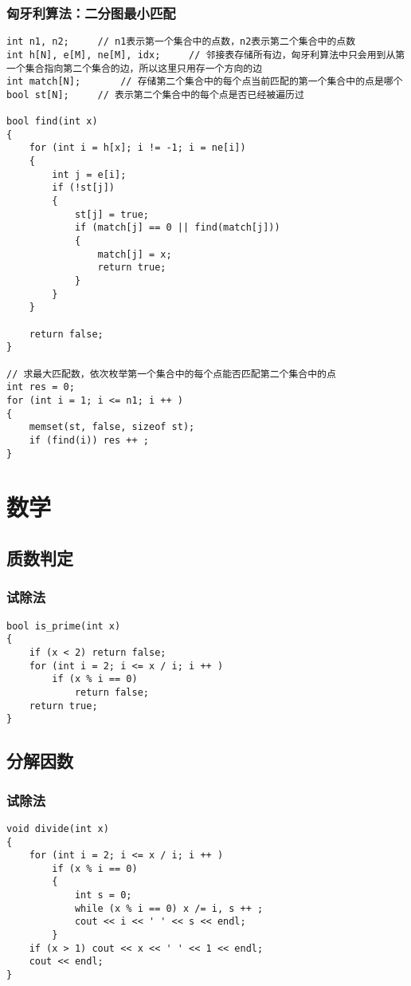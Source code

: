 \documentclass[12pt,a4paper,UTF16]{ctexbook}
\theoremstyle{plain}
\begin{document}
\subsection{匈牙利算法：二分图最小匹配}
\begin{lstlisting}
int n1, n2;     // n1表示第一个集合中的点数，n2表示第二个集合中的点数
int h[N], e[M], ne[M], idx;     // 邻接表存储所有边，匈牙利算法中只会用到从第一个集合指向第二个集合的边，所以这里只用存一个方向的边
int match[N];       // 存储第二个集合中的每个点当前匹配的第一个集合中的点是哪个
bool st[N];     // 表示第二个集合中的每个点是否已经被遍历过

bool find(int x)
{
    for (int i = h[x]; i != -1; i = ne[i])
    {
        int j = e[i];
        if (!st[j])
        {
            st[j] = true;
            if (match[j] == 0 || find(match[j]))
            {
                match[j] = x;
                return true;
            }
        }
    }

    return false;
}

// 求最大匹配数，依次枚举第一个集合中的每个点能否匹配第二个集合中的点
int res = 0;
for (int i = 1; i <= n1; i ++ )
{
    memset(st, false, sizeof st);
    if (find(i)) res ++ ;
}
\end{lstlisting}

\chapter{数学}
\section{质数判定}
\subsection{试除法}
\begin{lstlisting}
bool is_prime(int x)
{
    if (x < 2) return false;
    for (int i = 2; i <= x / i; i ++ )
        if (x % i == 0)
            return false;
    return true;
}
\end{lstlisting}

\section{分解因数}
\subsection{试除法}
\begin{lstlisting}
void divide(int x)
{
    for (int i = 2; i <= x / i; i ++ )
        if (x % i == 0)
        {
            int s = 0;
            while (x % i == 0) x /= i, s ++ ;
            cout << i << ' ' << s << endl;
        }
    if (x > 1) cout << x << ' ' << 1 << endl;
    cout << endl;
}
\end{lstlisting}
\end{document}
